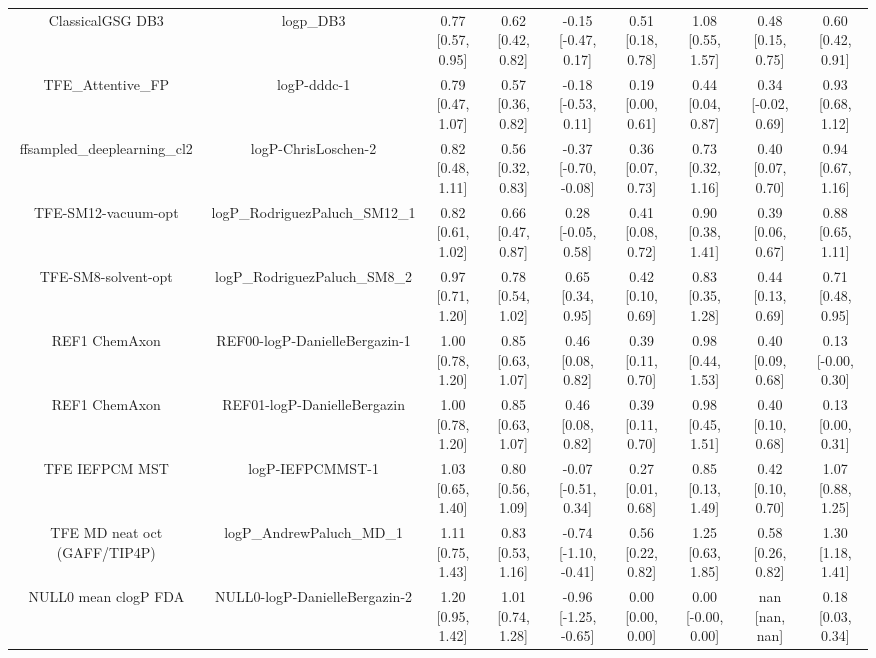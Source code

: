 \documentclass{article}
\begin{document}
\begin{center}
\begin{longtable}{|ccccccccc|}
             ClassicalGSG DB3 &                                      logp\_DB3 &  0.77 [0.57, 0.95] &  0.62 [0.42, 0.82] &   -0.15 [-0.47, 0.17] &  0.51 [0.18, 0.78] &     1.08 [0.55, 1.57] &     0.48 [0.15, 0.75] &     0.60 [0.42, 0.91] \\
             TFE_Attentive_FP &                                    logP-dddc-1 &  0.79 [0.47, 1.07] &  0.57 [0.36, 0.82] &   -0.18 [-0.53, 0.11] &  0.19 [0.00, 0.61] &     0.44 [0.04, 0.87] &    0.34 [-0.02, 0.69] &     0.93 [0.68, 1.12] \\
   ffsampled_deeplearning_cl2 &                            logP-ChrisLoschen-2 &  0.82 [0.48, 1.11] &  0.56 [0.32, 0.83] &  -0.37 [-0.70, -0.08] &  0.36 [0.07, 0.73] &     0.73 [0.32, 1.16] &     0.40 [0.07, 0.70] &     0.94 [0.67, 1.16] \\
          TFE-SM12-vacuum-opt &                 logP\_RodriguezPaluch\_SM12\_1 &  0.82 [0.61, 1.02] &  0.66 [0.47, 0.87] &    0.28 [-0.05, 0.58] &  0.41 [0.08, 0.72] &     0.90 [0.38, 1.41] &     0.39 [0.06, 0.67] &     0.88 [0.65, 1.11] \\
          TFE-SM8-solvent-opt &                  logP\_RodriguezPaluch\_SM8\_2 &  0.97 [0.71, 1.20] &  0.78 [0.54, 1.02] &     0.65 [0.34, 0.95] &  0.42 [0.10, 0.69] &     0.83 [0.35, 1.28] &     0.44 [0.13, 0.69] &     0.71 [0.48, 0.95] \\
                REF1 ChemAxon &                  REF00-logP-DanielleBergazin-1 &  1.00 [0.78, 1.20] &  0.85 [0.63, 1.07] &     0.46 [0.08, 0.82] &  0.39 [0.11, 0.70] &     0.98 [0.44, 1.53] &     0.40 [0.09, 0.68] &    0.13 [-0.00, 0.30] \\
                REF1 ChemAxon &                    REF01-logP-DanielleBergazin &  1.00 [0.78, 1.20] &  0.85 [0.63, 1.07] &     0.46 [0.08, 0.82] &  0.39 [0.11, 0.70] &     0.98 [0.45, 1.51] &     0.40 [0.10, 0.68] &     0.13 [0.00, 0.31] \\
               TFE IEFPCM MST &                               logP-IEFPCMMST-1 &  1.03 [0.65, 1.40] &  0.80 [0.56, 1.09] &   -0.07 [-0.51, 0.34] &  0.27 [0.01, 0.68] &     0.85 [0.13, 1.49] &     0.42 [0.10, 0.70] &     1.07 [0.88, 1.25] \\
 TFE MD neat oct (GAFF/TIP4P) &                      logP\_AndrewPaluch\_MD\_1 &  1.11 [0.75, 1.43] &  0.83 [0.53, 1.16] &  -0.74 [-1.10, -0.41] &  0.56 [0.22, 0.82] &     1.25 [0.63, 1.85] &     0.58 [0.26, 0.82] &     1.30 [1.18, 1.41] \\
         NULL0 mean clogP FDA &                  NULL0-logP-DanielleBergazin-2 &  1.20 [0.95, 1.42] &  1.01 [0.74, 1.28] &  -0.96 [-1.25, -0.65] &  0.00 [0.00, 0.00] &    0.00 [-0.00, 0.00] &        nan [nan, nan] &     0.18 [0.03, 0.34] \\

\end{longtable}
\end{center}
\end{document}
